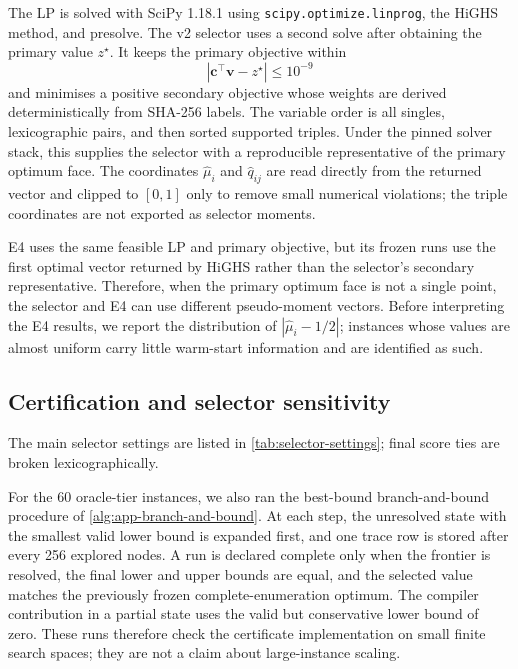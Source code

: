 \documentclass[a4paper,onecolumn,11pt,unpublished]{quantumarticle}
\theoremstyle{remark}
\begin{document}
The LP is solved with SciPy 1.18.1 using
\texttt{scipy.optimize.linprog}, the HiGHS method, and presolve.  The v2
selector uses a second solve after obtaining the primary value $z^\star$.  It
keeps the primary objective within
\begin{equation}
  \left|\bm c^\top\bm v-z^\star\right|\leq10^{-9}
  \label{eq:experimental-rlt-optimum-face}
\end{equation}
and minimises a positive secondary objective whose weights are derived
deterministically from SHA-256 labels.  The variable order is all singles,
lexicographic pairs, and then sorted supported triples.  Under the pinned
solver stack, this supplies the selector with a reproducible representative of
the primary optimum face.  The coordinates $\widehat\mu_i$ and
$\widehat q_{ij}$ are read directly from the returned vector and clipped to
$[0,1]$ only to remove small numerical violations; the triple coordinates are
not exported as selector moments.

E4 uses the same feasible LP and primary objective, but its frozen runs use the
first optimal vector returned by HiGHS rather than the selector's secondary
representative.  Therefore, when the primary optimum face is not a single
point, the selector and E4 can use different pseudo-moment vectors.  Before
interpreting the E4 results, we report the distribution of
$|\widehat\mu_i-1/2|$; instances whose values are almost uniform carry little
warm-start information and are identified as such.


\subsection{Certification and selector sensitivity}
\label{app:experimental-sensitivity}

The main selector settings are listed in \cref{tab:selector-settings}; final
score ties are broken lexicographically.

For the 60 oracle-tier instances, we also ran the best-bound branch-and-bound
procedure of \cref{alg:app-branch-and-bound}.  At each step, the unresolved
state with the smallest valid lower bound is expanded first, and one trace row
is stored after every 256 explored nodes.  A run is declared complete only
when the frontier is resolved, the final lower and upper bounds are equal, and
the selected value matches the previously frozen complete-enumeration optimum.
The compiler contribution in a partial state uses the valid but conservative
lower bound of zero.  These runs therefore check the certificate
implementation on small finite search spaces; they are not a claim about
large-instance scaling.
\end{document}
